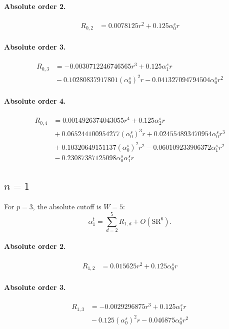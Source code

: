 \documentclass[10pt]{article}
\begin{document}
\paragraph{Absolute order 2.}
\begin{align*}
R_{0,2} &= 0.0078125 r^{2} + 0.125 \alpha_{0}^s r
\end{align*}

\paragraph{Absolute order 3.}
\begin{align*}
R_{0,3} &=  - 0.0030712246746565 r^{3} + 0.125 \alpha_{1}^s r \\
&{}  - 0.10280837917801 \left(\alpha_{0}^s\right)^{2} r - 0.041327094794504 \alpha_{0}^s r^{2}
\end{align*}

\paragraph{Absolute order 4.}
\begin{align*}
R_{0,4} &= 0.0014926374043055 r^{4} + 0.125 \alpha_{2}^s r \\
&{}  + 0.065244100954277 \left(\alpha_{0}^s\right)^{3} r + 0.024554893470954 \alpha_{0}^s r^{3} \\
&{}  + 0.10320649151137 \left(\alpha_{0}^s\right)^{2} r^{2} - 0.060109233906372 \alpha_{1}^s r^{2} \\
&{}  - 0.23087387125098 \alpha_{0}^s \alpha_{1}^s r
\end{align*}

\subsection{$n=1$}
For $p=3$, the absolute cutoff is $W=5$:
\[\alpha_{1}^t=\sum_{d=2}^{5}R_{1,d}+O(\mathrm{SR}^{6}).\]
\paragraph{Absolute order 2.}
\begin{align*}
R_{1,2} &= 0.015625 r^{2} + 0.125 \alpha_{0}^s r
\end{align*}

\paragraph{Absolute order 3.}
\begin{align*}
R_{1,3} &=  - 0.0029296875 r^{3} + 0.125 \alpha_{1}^s r \\
&{}  - 0.125 \left(\alpha_{0}^s\right)^{2} r - 0.046875 \alpha_{0}^s r^{2}
\end{align*}
\end{document}
